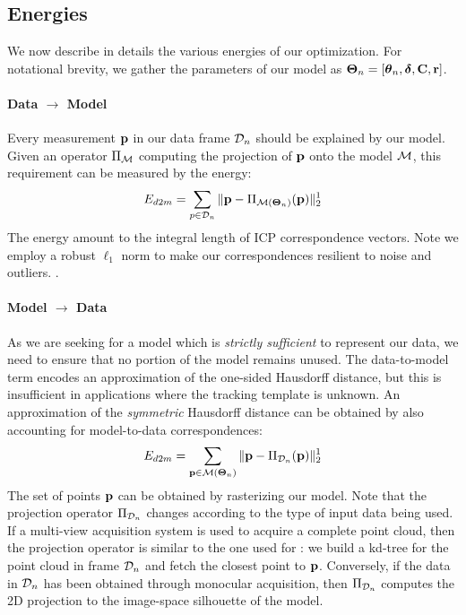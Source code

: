 \subsection{Energies}
We now describe in details the various energies of our optimization. For notational brevity, we gather the parameters of our model as $\boldsymbol{\Theta}_n=[\boldsymbol{\theta}_n, \boldsymbol{\delta}, \mathbf{C}, \mathbf{r}]$.

\paragraph{Data $\rightarrow$ Model}
Every measurement $\mathbf{p}$ in our data frame $\mathcal{D}_n$ should be explained by our model. Given an operator $\Pi_{\mathcal{M}}$ computing the projection of $\mathbf{p}$ onto the model $\mathcal{M}$, this requirement can be measured by the energy:
% 
\begin{equation}
E_{d2m} = \sum_{p \in \mathcal{D}_n} \| \mathbf{p} - \Pi_{\mathcal{M}(\boldsymbol{\Theta}_n)}(\mathbf{p})\|_2^1
\label{eq:d2m}
\end{equation}
% 
The energy amount to the integral length of ICP correspondence vectors. Note we employ a robust $\ell_1$ norm to make our correspondences resilient to noise and outliers. .



\paragraph{Model $\rightarrow$ Data}
As we are seeking for a model which is \emph{strictly sufficient} to represent our data, we need to ensure that no portion of the model remains unused. The data-to-model term encodes an approximation of the one-sided Hausdorff distance, but this is insufficient in applications where the tracking template is unknown. An approximation of the \emph{symmetric} Hausdorff distance can be obtained by also accounting for model-to-data correspondences:
\begin{equation}
E_{d2m} = \sum_{\mathbf{p} \in \mathcal{M}(\boldsymbol{\Theta}_n)} \| \mathbf{p} - \Pi_{\mathcal{D}_n}(\mathbf{p})\|_2^1
\label{eq:m2d}
\end{equation}
The set of points $\mathbf{p}$ can be obtained by rasterizing our model. Note that the projection operator $\Pi_{\mathcal{D}_n}$ changes according to the type of input data being used. If a multi-view acquisition system is used to acquire a complete point cloud, then the projection operator is similar to the one used for : we build a kd-tree for the point cloud in frame $\mathcal{D}_n$ and fetch the closest point to $\mathbf{p}$. Conversely, if the data in $\mathcal{D}_n$ has been obtained through monocular acquisition, then $\Pi_{\mathcal{D}_n}$ computes the 2D projection to the image-space silhouette of the model.



